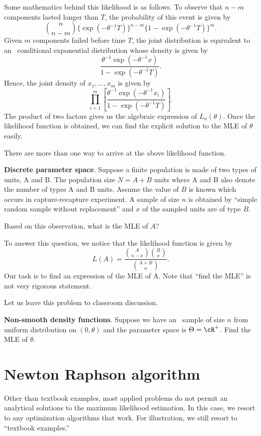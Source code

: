 Some mathematics behind this likelihood is as follows.
To observe that $n-m$ components lasted longer than $T$, the probability
of this event is given by
\[
{n \choose n-m} \{ \exp ( - \theta^{-1} T)\}^{n-m} \{ 1-  \exp ( - \theta^{-1} T)\}^m.
\]
Given $m$ components failed before time $T$, the joint distribution
is equivalent to an \iid\ conditional exponential distribution whose density
is given by
\[
\frac{ \theta ^{-1} \exp ( - \theta^{-1} x) }{1-  \exp ( - \theta^{-1} T)}.
\]
Hence, the joint density of $x_1, \ldots, x_m$ is given by
\[
\prod_{i=1}^m \left [ \frac{ \theta ^{-1} \exp ( - \theta^{-1} x_i) }{1-  \exp ( - \theta^{-1} T)}
\right ].
\]
The product of two factors gives us the algebraic expression of
$L_n(\theta)$.
Once the likelihood function is obtained, we can find the explicit
solution to the MLE of $\theta$ easily.

There are more than one way to arrive at the above likelihood function.

\vs
\noindent
{\bf Discrete parameter space}.
Suppose a finite population is made of two types of units, A and B.
The population size $N = A+B$ units where A and B also denote
the number of types A and B units. Assume  the value of $B$ is
known which occurs in capture-recapture experiment. 
A sample of size $n$ is obtained by ``simple random sample without replacement'' 
and $x$ of the sampled units are of type $B$.

Based on this observation, what is the MLE of $A$?

To answer this question, we notice that the likelihood
function is given by
\[
L(A) = \frac{ {A \choose {n-x}} {B \choose x}}{{{A+B} \choose n}}.
\]
Our task is to find an expression of the MLE of A.
Note that ``find the MLE'' is not very rigorous statement.

Let us leave this problem to classroom discussion.

\vs
\noindent
{\bf Non-smooth density functions}.
Suppose we have an \iid\ sample of size $n$ from uniform
distribution on $(0, \theta)$ and the parameter space is
$\Theta = \cR^+$.
Find the MLE of $\theta$.

\section{Newton Raphson algorithm}
Other than textbook examples, most applied problems do
not permit an analytical solutions to the maximum likelihood
estimation. In this case, we resort to any optimization algorithms
that work. For illustration, we still resort to ``textbook examples.''

